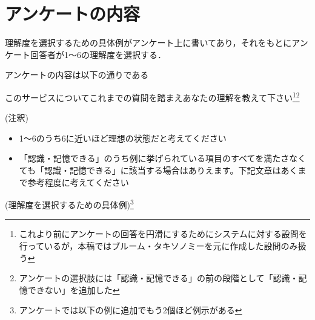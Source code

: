 \section{アンケートの内容}
理解度を選択するための具体例がアンケート上に書いてあり，それをもとにアンケート回答者が1～6の理解度を選択する．

アンケートの内容は以下の通りである\newline

このサービスについてこれまでの質問を踏まえあなたの理解を教えて下さい\footnote{これより前にアンケートの回答を円滑にするためにシステムに対する設問を行っているが，本稿ではブルーム・タキソノミーを元に作成した設問のみ扱う}\footnote{アンケートの選択肢には「認識・記憶できる」の前の段階として「認識・記憶できない」を追加した}\newline

(注釈)
\begin{itemize}
    \item 1～6のうち6に近いほど理想の状態だと考えてください
    \item 「認識・記憶できる」のうち例に挙げられている項目のすべてを満たさなくても「認識・記憶できる」に該当する場合はありえます。下記文章はあくまで参考程度に考えてください
\end{itemize}
(理解度を選択するための具体例)\footnote{アンケートでは以下の例に追加でもう2個ほど例示がある}

\renewcommand{\arraystretch}{1.5} %
\scriptsize

